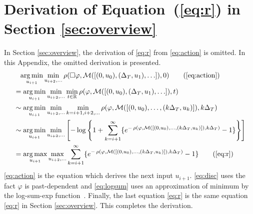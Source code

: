 \setcounter{equation}{0}
\renewcommand{\theequation}{A\arabic{equation}}
\section{Derivation of Equation~(\ref{eq:r}) in Section \ref{sec:overview}}
\label{sec:appendix}
In Section \ref{sec:overview}, the derivation of \eqref{eq:r} from \eqref{eq:action} is omitted.
In this Appendix, the omitted derivation is presented.
\begin{align}
  &\phantom{=} \argmin_{u_{i+1}} \min_{u_{i+2}, \ldots} \rob(\square \varphi, \mathcal{M}(\left[(0, u_0), (\Delta_T, u_1), \ldots \right]), 0) \tag{\ref{eq:action}} \\
  &= \argmin_{u_{i+1}} \min_{u_{i+2}, \ldots} \min_{t \in \mathbb R} \rob(\varphi, \mathcal{M}(\left[(0, u_0), (\Delta_T, u_1), \ldots \right]), t)\\
  &\sim \argmin_{u_{i+1}} \min_{u_{i+2}, \ldots} \min_{k = i+1, i+2, \ldots} \rob(\varphi, \mathcal{M}(\left[(0, u_0), \ldots, (k\Delta_T, u_k) \right]), k\Delta_T) \label{eq:disc}\\
  &\sim \argmin_{u_{i+1}} \min_{u_{i+2}, \ldots} \left[ - \log \left\{ 1 + \sum_{k=i+1}^\infty \{ e^{- \rob(\varphi, \mathcal{M}(\left[(0, u_0), \ldots, (k\Delta_T, u_k) \right]), k\Delta_T)} - 1\} \right\} \right] \label{eq:logsum}\\
  &= \argmax_{u_{i+1}} \max_{u_{i+2}, \ldots} \sum_{k=i+1}^\infty \{ e^{- \rob(\varphi, \mathcal{M}(\left[(0, u_0), \ldots, (k\Delta_T, u_k) \right]), k\Delta_T)} - 1\} \tag{\ref{eq:r}}
\end{align}
\eqref{eq:action} is the equation which derives the next input $u_{i+1}$.
\eqref{eq:disc} uses the fact $\varphi$ is past-dependent and \eqref{eq:logsum} uses an approximation of minimum by the log-sum-exp function~\cite{cook2011basic}.
Finally, the last equation \eqref{eq:r} is the same equation \eqref{eq:r} in Section \ref{sec:overview}.
This completes the derivation.

